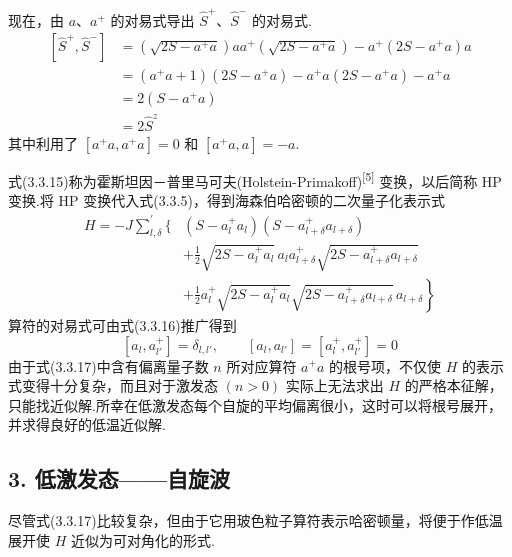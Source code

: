 现在，由 $a$、$a^{+}$ 的对易式导出 $\hat{S}^{+}$、$\hat{S}^{-}$ 的对易式.
\begin{equation*}
\begin{aligned}
  \left[\hat{S}^{+},\hat{S}^{-}\right]&=\left(\sqrt{2S-a^{+}a}\right)aa^{+}\left(\sqrt{2S-a^{+}a}\right)
  -a^{+}\left(2S-a^{+}a\right)a\\
  &=\left(a^{+}a+1\right)\left(2S-a^{+}a\right)-a^{+}a\left(2S-a^{+}a\right)-a^{+}a\\
  &=2\left(S-a^{+}a\right)\\
  &=2\hat{S}^{z}
\end{aligned}
\end{equation*}
其中利用了 $\left[a^{+}a,a^{+}a\right]=0$ 和 $\left[a^{+}a,a\right]=-a$.

式(3.3.15)称为霍斯坦因－普里马可夫(Holstein-Primakoff)\textsuperscript{[5]}
变换，以后简称 HP 变换.将 HP 变换代入式(3.3.5)，得到海森伯哈密顿的二次量子化表示式
\begin{equation}
\begin{aligned}
  H=-J\sum_{l,\delta}^{\prime}\bigl\{&\left(S-a_l^{+}a_l\right)\left(S-a_{l+\delta}^{+}a_{l+\delta}\right)\\
  &+\frac{1}{2}\sqrt{2S-a_l^{+}a_l}\,a_l a_{l+\delta}^{+}\sqrt{2S-a_{l+\delta}^{+}a_{l+\delta}}\\
  &\left.+\frac{1}{2}a_l^{+}\sqrt{2S-a_l^{+}a_l}\sqrt{2S-a_{l+\delta}^{+}a_{l+\delta}}\,a_{l+\delta}\right\}
\end{aligned}
\end{equation}
算符的对易式可由式(3.3.16)推广得到
\begin{equation}
  \left[a_l,a_{l'}^{+}\right]=\delta_{l,l'},\qquad
  \left[a_l,a_{l'}\right]=\left[a_l^{+},a_{l'}^{+}\right]=0
\end{equation}
由于式(3.3.17)中含有偏离量子数 $n$ 所对应算符 $a^{+}a$ 的根号项，不仅使 $H$
的表示式变得十分复杂，而且对于激发态 $\left(n>0\right)$ 实际上无法求出 $H$ 的严格本征解，只能找近似解.所幸在低激发态每个自旋的平均偏离很小，这时可以将根号展开，并求得良好的低温近似解.

\subsection*{3. 低激发态——自旋波}

尽管式(3.3.17)比较复杂，但由于它用玻色粒子算符表示哈密顿量，将便于作低温展开使 $H$ 近似为可对角化的形式.

